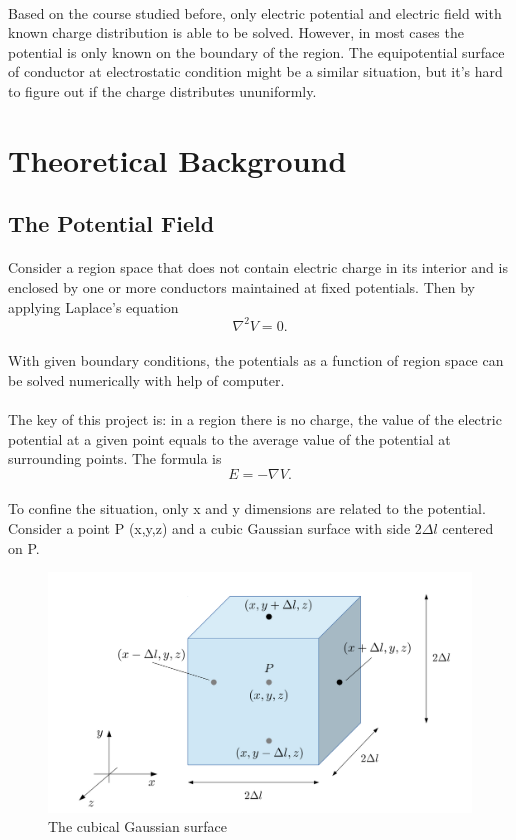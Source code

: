 \documentclass[12pt]{report}
\begin{document}
\paragraph{}Based on the course studied before, only electric potential and electric field with known charge distribution is able to be solved. However, in most cases the potential is only known on the boundary of the region. The equipotential surface of conductor at electrostatic condition might be a similar situation, but it’s hard to figure out if the charge distributes ununiformly. 
\section{Theoretical Background}
\subsection{The Potential Field}
\paragraph{}Consider a region space that does not contain electric charge in its interior and is enclosed by one or more conductors maintained at fixed potentials. Then by applying Laplace’s equation
$$\nabla^2 V=0.$$
\paragraph{}With given boundary conditions, the potentials as a function of region space can be solved numerically with help of computer.
\paragraph{}The key of this project is: in a region there is no charge, the value of the electric potential at a given point equals to the average value of the potential at surrounding points. The formula is 
\begin{equation}
    E=-\nabla V.
\end{equation}
\paragraph{}To confine the situation, only x and y dimensions are related to the potential. Consider a point P (x,y,z) and a cubic Gaussian surface with side $2\Delta l$ centered on P. \begin{figure}[H]
    \centering
    \includegraphics[width=0.8\linewidth]{1.png}
    \caption{The cubical Gaussian surface}
    \label{fig:my_label}
\end{figure}
\end{document}
